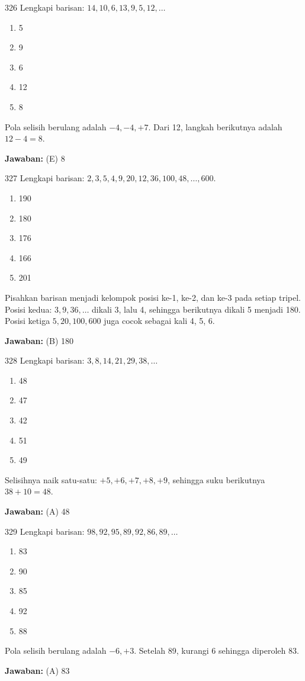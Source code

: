 \documentclass[11pt]{article}
\newenvironment{pil}{\begin{enumerate}[label=(\Alph*),leftmargin=*,itemsep=1pt,topsep=3pt]}{\end{enumerate}}
\newcommand{\jw}[1]{\par\smallskip\begin{jawbox}\textbf{Jawaban:} #1\end{jawbox}}
\begin{document}
\begin{soalbox}{3}{26}
Lengkapi barisan: $14, 10, 6, 13, 9, 5, 12, \ldots$
\begin{pil}\item 5 \item 9 \item 6 \item 12 \item 8\end{pil}
\end{soalbox}
\begin{pembox}
Pola selisih berulang adalah $-4, -4, +7$. Dari 12, langkah berikutnya adalah $12-4=8$.
\jw{(E) 8}
\end{pembox}

\begin{soalbox}{3}{27}
Lengkapi barisan: $2, 3, 5, 4, 9, 20, 12, 36, 100, 48, \ldots, 600$.
\begin{pil}\item 190 \item 180 \item 176 \item 166 \item 201\end{pil}
\end{soalbox}
\begin{pembox}
Pisahkan barisan menjadi kelompok posisi ke-1, ke-2, dan ke-3 pada setiap tripel. Posisi kedua: $3, 9, 36, \ldots$ dikali 3, lalu 4, sehingga berikutnya dikali 5 menjadi 180. Posisi ketiga $5, 20, 100, 600$ juga cocok sebagai kali 4, 5, 6.
\jw{(B) 180}
\end{pembox}

\begin{soalbox}{3}{28}
Lengkapi barisan: $3, 8, 14, 21, 29, 38, \ldots$
\begin{pil}\item 48 \item 47 \item 42 \item 51 \item 49\end{pil}
\end{soalbox}
\begin{pembox}
Selisihnya naik satu-satu: $+5, +6, +7, +8, +9$, sehingga suku berikutnya $38+10=48$.
\jw{(A) 48}
\end{pembox}

\begin{soalbox}{3}{29}
Lengkapi barisan: $98, 92, 95, 89, 92, 86, 89, \ldots$
\begin{pil}\item 83 \item 90 \item 85 \item 92 \item 88\end{pil}
\end{soalbox}
\begin{pembox}
Pola selisih berulang adalah $-6, +3$. Setelah 89, kurangi 6 sehingga diperoleh 83.
\jw{(A) 83}
\end{pembox}
\end{document}
